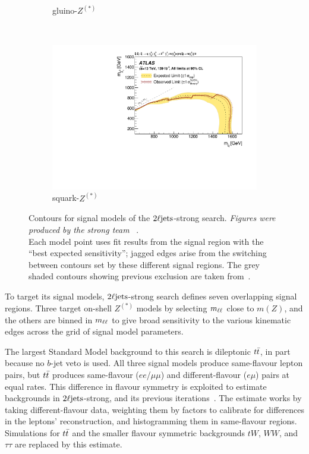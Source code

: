 \begin{figure}[tp]
\begin{subfigure}{0.48\textwidth}
\caption{gluino-$Z^{(*)}$}
\end{subfigure}
\\[0.5em]
\begin{subfigure}{0.48\textwidth}
\centering
\includegraphics[width=\textwidth]{figures/2ljets_strong_contours_squark_z.pdf}
\caption{squark-$Z^{(*)}$}
\end{subfigure}
\caption[
Contours for signal models of the $\twoljets$-strong search
]{%
Contours for signal models of the $\twoljets$-strong search.
\emph{Figures were produced by the strong team%
}~\cite{atlas2022searches}.
\\[0.5em]
Each model point uses fit results from the signal region with the
``best expected sensitivity'';
jagged edges arise from the switching between contours set by these different
signal regions.
The grey shaded contours showing previous exclusion are taken
from~\cite{atlas_susy_strong_2l_partial_run2}.
}
\label{fig:2ljets_strong_contours}
\end{figure}

To target its signal models, $\twoljets$-strong search defines seven
overlapping signal regions.
Three target on-shell $Z^{(*)}$ models by selecting $m_{\ell\ell}$ close to $m(Z)$,
and the others are binned in $m_{\ell\ell}$ to give broad sensitivity to the various
kinematic edges across the grid of signal model parameters.

The largest Standard Model background to this search is dileptonic $t\bar t$,
in part because no $b$-jet veto is used.
All three signal models produce same-flavour lepton pairs, but $t\bar t$
produces same-flavour ($ee$/$\mu\mu$) and different-flavour ($e\mu$) pairs at
equal rates.
This difference in flavour symmetry is exploited to estimate backgrounds in
$\twoljets$-strong,
and its previous iterations~\cite{cms_susy_2016_strong_2l_run2_1}.
The estimate works by taking different-flavour data, weighting them by factors
to calibrate for differences in the leptons' reconstruction, and histogramming
them in same-flavour regions.
Simulations for $t\bar t$ and the smaller flavour symmetric backgrounds
$tW$, $WW$, and $\tau\tau$ are replaced by this estimate.

